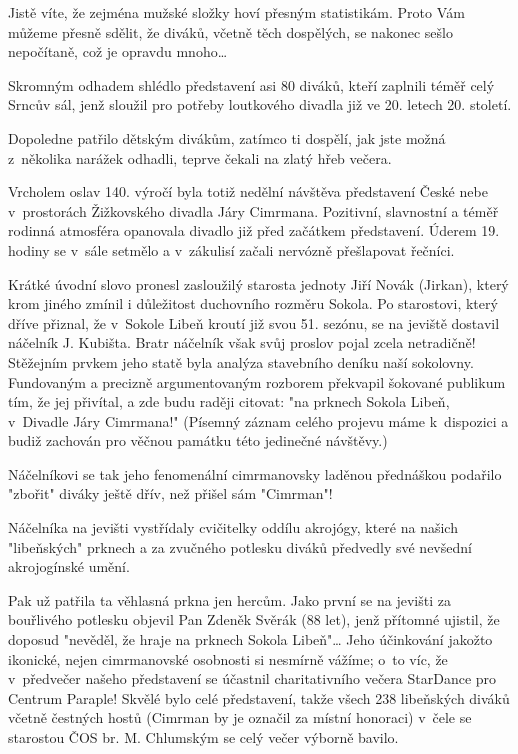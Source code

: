 \documentclass[11pt]{article}
\begin{document}
Jistě víte, že zejména mužské složky hoví přesným statistikám. Proto Vám
můžeme přesně sdělit, že diváků, včetně těch dospělých, se nakonec sešlo
nepočítaně, což je opravdu mnoho\ldots{}

Skromným odhadem shlédlo představení asi 80 diváků, kteří zaplnili téměř
celý Srncův sál, jenž sloužil pro potřeby loutkového divadla již ve 20.
letech 20. století.

Dopoledne patřilo dětským divákům, zatímco ti dospělí, jak jste možná
z~několika narážek odhadli, teprve čekali na zlatý hřeb večera.

Vrcholem oslav 140. výročí byla totiž nedělní návštěva představení České
nebe v~prostorách Žižkovského divadla Járy Cimrmana. Pozitivní,
slavnostní a téměř rodinná atmosféra opanovala divadlo již před začátkem
představení. Úderem 19. hodiny se v~sále setmělo a v~zákulisí začali
nervózně přešlapovat řečníci.

Krátké úvodní slovo pronesl zasloužilý starosta jednoty Jiří Novák
(Jirkan), který krom jiného zmínil i důležitost duchovního rozměru
Sokola. Po starostovi, který dříve přiznal, že v~Sokole Libeň kroutí již
svou 51. sezónu, se na jeviště dostavil náčelník J. Kubišta. Bratr
náčelník však svůj proslov pojal zcela netradičně! Stěžejním prvkem jeho
statě byla analýza stavebního deníku naší sokolovny. Fundovaným a
precizně argumentovaným rozborem překvapil šokované publikum tím, že jej
přivítal, a zde budu raději citovat: "na prknech Sokola Libeň, v~Divadle
Járy Cimrmana!" (Písemný záznam celého projevu máme k~dispozici a
budiž zachován pro věčnou památku této jedinečné návštěvy.)

Náčelníkovi se tak jeho fenomenální cimrmanovsky laděnou přednáškou
podařilo "zbořit" diváky ještě dřív, než přišel sám "Cimrman"!

Náčelníka na jevišti vystřídaly cvičitelky oddílu akrojógy, které na
našich "libeňských" prknech a za zvučného potlesku diváků předvedly své
nevšední akrojogínské umění.

Pak už patřila ta věhlasná prkna jen hercům. Jako první se na jevišti za
bouřlivého potlesku objevil Pan Zdeněk Svěrák (88 let), jenž přítomné
ujistil, že doposud "nevěděl, že hraje na prknech Sokola Libeň"\ldots{}
Jeho účinkování jakožto ikonické, nejen cimrmanovské osobnosti si
nesmírně vážíme; o~to víc, že v~předvečer našeho představení se účastnil
charitativního večera StarDance pro Centrum Paraple! Skvělé bylo celé
představení, takže všech 238 libeňských diváků včetně čestných hostů
(Cimrman by je označil za místní honoraci) v~čele se starostou ČOS br.
M. Chlumským se celý večer výborně bavilo.
\end{document}
